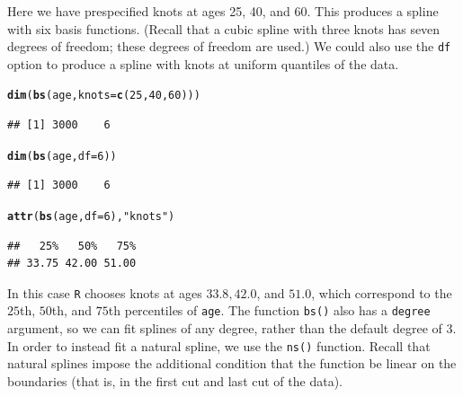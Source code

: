 \documentclass[12pt]{article}\usepackage[]{graphicx}\usepackage[]{color}
\makeatletter
\newcommand{\hlnum}[1]{\textcolor[rgb]{0.686,0.059,0.569}{#1}}%
\newcommand{\hlstr}[1]{\textcolor[rgb]{0.192,0.494,0.8}{#1}}%
\newcommand{\hlstd}[1]{\textcolor[rgb]{0.345,0.345,0.345}{#1}}%
\newcommand{\hlkwc}[1]{\textcolor[rgb]{0.333,0.667,0.333}{#1}}%
\newcommand{\hlkwd}[1]{\textcolor[rgb]{0.737,0.353,0.396}{\textbf{#1}}}%
\newenvironment{kframe}{%
 \def\at@end@of@kframe{}%
 \ifinner\ifhmode%
  \def\at@end@of@kframe{\end{minipage}}%
  \begin{minipage}{\columnwidth}%
 \fi\fi%
 \def\FrameCommand##1{\hskip\@totalleftmargin \hskip-\fboxsep
 \colorbox{shadecolor}{##1}\hskip-\fboxsep
     \hskip-\linewidth \hskip-\@totalleftmargin \hskip\columnwidth}%
 \MakeFramed {\advance\hsize-\width
   \@totalleftmargin\z@ \linewidth\hsize
   \@setminipage}}%
 {\par\unskip\endMakeFramed%
 \at@end@of@kframe}
\newenvironment{knitrout}{}{} %
\makeatother
\begin{document}
Here we have prespecified knots at ages 25, 40, and 60. This produces a spline with six basis functions. (Recall that a cubic spline with three knots has seven degrees of freedom; these degrees of freedom are used.) We could also use the \texttt{df} option to produce a spline with knots at uniform quantiles of the data.

\begin{knitrout}
\color{fgcolor}\begin{kframe}
\begin{alltt}
\hlkwd{dim}\hlstd{(}\hlkwd{bs}\hlstd{(age,} \hlkwc{knots}\hlstd{=}\hlkwd{c}\hlstd{(}\hlnum{25}\hlstd{,}\hlnum{40}\hlstd{,}\hlnum{60}\hlstd{)))}
\end{alltt}
\begin{verbatim}
## [1] 3000    6
\end{verbatim}
\begin{alltt}
\hlkwd{dim}\hlstd{(}\hlkwd{bs}\hlstd{(age,}\hlkwc{df}\hlstd{=}\hlnum{6}\hlstd{))}
\end{alltt}
\begin{verbatim}
## [1] 3000    6
\end{verbatim}
\begin{alltt}
\hlkwd{attr}\hlstd{(}\hlkwd{bs}\hlstd{(age,} \hlkwc{df}\hlstd{=}\hlnum{6}\hlstd{),}\hlstr{"knots"}\hlstd{)}
\end{alltt}
\begin{verbatim}
##   25%   50%   75% 
## 33.75 42.00 51.00
\end{verbatim}
\end{kframe}
\end{knitrout}

In this case \texttt{R} chooses knots at ages $33.8, 42.0$, and $51.0$, which correspond to the $25$th, $50$th, and $75$th percentiles of \texttt{age}. The function \texttt{bs()} also has a \texttt{degree} argument, so we can fit splines of any degree, rather than the default degree of $3$.\\

In order to instead fit a natural spline, we use the \texttt{ns()} function. Recall that natural splines impose the additional condition that the function be linear on the boundaries (that is, in the first cut and last cut of the data).
\end{document}
